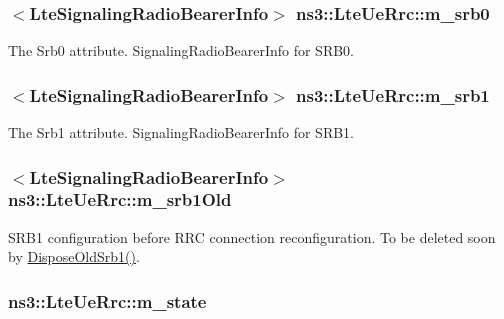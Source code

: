 \subsubsection[{\texorpdfstring{m\+\_\+srb0}{m_srb0}}]{$<${\bf Lte\+Signaling\+Radio\+Bearer\+Info}$>$ ns3\+::\+Lte\+Ue\+Rrc\+::m\+\_\+srb0\hspace{0.3cm}{\ttfamily [private]}}\hypertarget{classns3_1_1LteUeRrc_a1ed76d4e424d770de67c3e39f516ac4d}{}\label{classns3_1_1LteUeRrc_a1ed76d4e424d770de67c3e39f516ac4d}
The {\ttfamily Srb0} attribute. Signaling\+Radio\+Bearer\+Info for S\+R\+B0. 
\subsubsection[{\texorpdfstring{m\+\_\+srb1}{m_srb1}}]{$<${\bf Lte\+Signaling\+Radio\+Bearer\+Info}$>$ ns3\+::\+Lte\+Ue\+Rrc\+::m\+\_\+srb1\hspace{0.3cm}{\ttfamily [private]}}\hypertarget{classns3_1_1LteUeRrc_aeb8ad627a3df9126d146bacb6dc3dce6}{}\label{classns3_1_1LteUeRrc_aeb8ad627a3df9126d146bacb6dc3dce6}
The {\ttfamily Srb1} attribute. Signaling\+Radio\+Bearer\+Info for S\+R\+B1. 
\subsubsection[{\texorpdfstring{m\+\_\+srb1\+Old}{m_srb1Old}}]{$<${\bf Lte\+Signaling\+Radio\+Bearer\+Info}$>$ ns3\+::\+Lte\+Ue\+Rrc\+::m\+\_\+srb1\+Old\hspace{0.3cm}{\ttfamily [private]}}\hypertarget{classns3_1_1LteUeRrc_a0f9ba002db6bffa220c9333a9ff09448}{}\label{classns3_1_1LteUeRrc_a0f9ba002db6bffa220c9333a9ff09448}
S\+R\+B1 configuration before R\+RC connection reconfiguration. To be deleted soon by \hyperlink{classns3_1_1LteUeRrc_ad19a088ff16c8c403c9f93cdcd72e639}{Dispose\+Old\+Srb1()}. 
\subsubsection[{\texorpdfstring{m\+\_\+state}{m_state}}]{ ns3\+::\+Lte\+Ue\+Rrc\+::m\+\_\+state\hspace{0.3cm}{\ttfamily [private]}}\hypertarget{classns3_1_1LteUeRrc_a81d711739d758a5add38b100086be632}{}\label{classns3_1_1LteUeRrc_a81d711739d758a5add38b100086be632}


